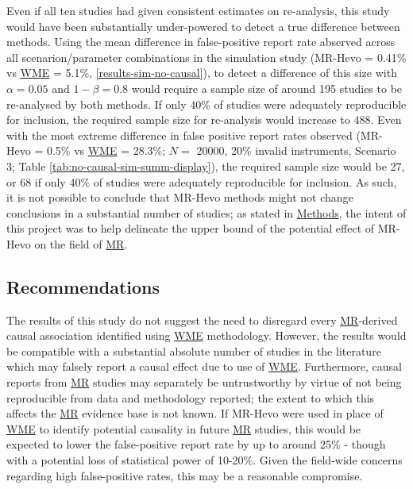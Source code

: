 \documentclass[
]{article}
\begin{document}
Even if all ten studies had given consistent estimates on re-analysis, this study would have been substantially under-powered to detect a true difference between methods. Using the mean difference in false-positive report rate abserved across all scenarion/parameter combinations in the simulation study (MR-Hevo = 0.41\% vs \hyperref[acronyms_WME]{WME} = 5.1\%, \ref{results-sim-no-causal}), to detect a difference of this size with \(\alpha = 0.05\) and \(1 - \beta = 0.8\) would require a sample size of around 195 studies to be re-analysed by both methods. If only 40\% of studies were adequately reproducible for inclusion, the required sample size for re-analysis would increase to 488. Even with the most extreme difference in false positive report rates observed (MR-Hevo = 0.5\% vs \hyperref[acronyms_WME]{WME} = 28.3\%; \(N =\) 20000, 20\% invalid instruments, Scenario 3; Table \ref{tab:no-causal-sim-summ-display}), the required sample size would be 27, or 68 if only 40\% of studies were adequately reproducible for inclusion. As such, it is not possible to conclude that MR-Hevo methods might not change conclusions in a substantial number of studies; as stated in \hyperref[Methods]{Methods}, the intent of this project was to help delineate the upper bound of the potential effect of MR-Hevo on the field of \hyperref[acronyms_MR]{MR}.

\subsection{Recommendations}\label{recommendations}

The results of this study do not suggest the need to disregard every \hyperref[acronyms_MR]{MR}-derived causal association identified using \hyperref[acronyms_WME]{WME} methodology. However, the results would be compatible with a substantial absolute number of studies in the literature which may falsely report a causal effect due to use of \hyperref[acronyms_WME]{WME}. Furthermore, causal reports from \hyperref[acronyms_MR]{MR} studies may separately be untrustworthy by virtue of not being reproducible from data and methodology reported; the extent to which this affects the \hyperref[acronyms_MR]{MR} evidence base is not known. If MR-Hevo were used in place of \hyperref[acronyms_WME]{WME} to identify potential causality in future \hyperref[acronyms_MR]{MR} studies, this would be expected to lower the false-positive report rate by up to around 25\% - though with a potential loss of statistical power of 10-20\%. Given the field-wide concerns regarding high false-positive rates, this may be a reasonable compromise.
\end{document}
